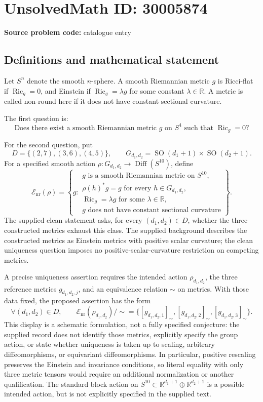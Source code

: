 \documentclass[11pt]{article}
\newcommand{\R}{\mathbb{R}}
\begin{document}
\section*{UnsolvedMath ID: 30005874}
\textbf{Source problem code:} catalogue entry
\subsection{Definitions and mathematical statement}
Let \(S^n\) denote the smooth \(n\)-sphere. A smooth Riemannian metric \(g\) is Ricci-flat if \(\operatorname{Ric}_g=0\), and Einstein if \(\operatorname{Ric}_g=\lambda g\) for some constant \(\lambda\in\R\). A metric is called non-round here if it does not have constant sectional curvature.

The first question is:
\[
\text{Does there exist a smooth Riemannian metric }g\text{ on }S^4
\text{ such that }\operatorname{Ric}_g=0?
\]

For the second question, put
\[
D=\{(2,7),(3,6),(4,5)\},\qquad
G_{d_1,d_2}=\operatorname{SO}(d_1+1)\times\operatorname{SO}(d_2+1).
\]
For a specified smooth action \(\rho:G_{d_1,d_2}\to\operatorname{Diff}(S^{10})\), define
\[
\mathcal E_{\mathrm{nr}}(\rho)=
\left\{g:\begin{array}{l}
g\text{ is a smooth Riemannian metric on }S^{10},\\
\rho(h)^*g=g\text{ for every }h\in G_{d_1,d_2},\\
\operatorname{Ric}_g=\lambda g\text{ for some }\lambda\in\R,\\
g\text{ does not have constant sectional curvature}
\end{array}\right\}.
\]
The supplied clean statement asks, for every \((d_1,d_2)\in D\), whether the three constructed metrics exhaust this class. The supplied background describes the constructed metrics as Einstein metrics with positive scalar curvature; the clean uniqueness question imposes no positive-scalar-curvature restriction on competing metrics.

A precise uniqueness assertion requires the intended action \(\rho_{d_1,d_2}\), the three reference metrics \(g_{d_1,d_2,j}\), and an equivalence relation \(\sim\) on metrics. With those data fixed, the proposed assertion has the form
\[
\forall(d_1,d_2)\in D,\qquad
\mathcal E_{\mathrm{nr}}(\rho_{d_1,d_2})/\!\sim
=
\{[g_{d_1,d_2,1}]_{\sim},[g_{d_1,d_2,2}]_{\sim},
[g_{d_1,d_2,3}]_{\sim}\}.
\]
This display is a schematic formulation, not a fully specified conjecture: the supplied record does not identify those metrics, explicitly specify the group action, or state whether uniqueness is taken up to scaling, arbitrary diffeomorphisms, or equivariant diffeomorphisms. In particular, positive rescaling preserves the Einstein and invariance conditions, so literal equality with only three metric tensors would require an additional normalization or another qualification. The standard block action on \(S^{10}\subset\R^{d_1+1}\oplus\R^{d_2+1}\) is a possible intended action, but is not explicitly specified in the supplied text.
\end{document}
